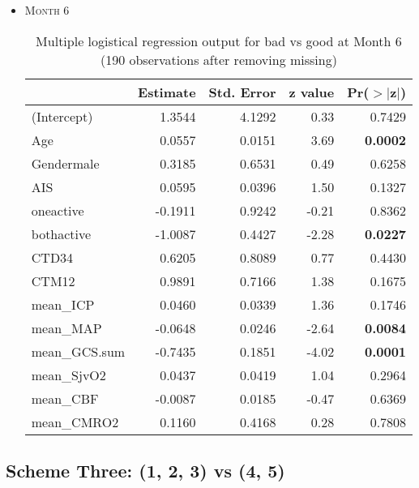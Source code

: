 \documentclass{article}
\begin{document}
\begin{itemize}
\item \textsc{Month 6}
\begin{table}[H]
\centering
\begin{tabular}{lrrrr}
  \hline
 & Estimate & Std. Error & z value & Pr($>$$|$z$|$) \\ 
  \hline
(Intercept) & 1.3544 & 4.1292 & 0.33 & 0.7429 \\ 
  Age & 0.0557 & 0.0151 & 3.69 & {\bf 0.0002} \\ 
  Gendermale & 0.3185 & 0.6531 & 0.49 & 0.6258 \\ 
  AIS & 0.0595 & 0.0396 & 1.50 & 0.1327 \\ 
  oneactive & -0.1911 & 0.9242 & -0.21 & 0.8362 \\ 
  bothactive & -1.0087 & 0.4427 & -2.28 & {\bf 0.0227} \\ 
  CTD34 & 0.6205 & 0.8089 & 0.77 & 0.4430 \\ 
  CTM12 & 0.9891 & 0.7166 & 1.38 & 0.1675 \\ 
  mean\_ICP & 0.0460 & 0.0339 & 1.36 & 0.1746 \\ 
  mean\_MAP & -0.0648 & 0.0246 & -2.64 & {\bf 0.0084} \\ 
  mean\_GCS.sum & -0.7435 & 0.1851 & -4.02 & {\bf 0.0001} \\ 
  mean\_SjvO2 & 0.0437 & 0.0419 & 1.04 & 0.2964 \\ 
  mean\_CBF & -0.0087 & 0.0185 & -0.47 & 0.6369 \\ 
  mean\_CMRO2 & 0.1160 & 0.4168 & 0.28 & 0.7808 \\ 
   \hline
\end{tabular}
\caption{Multiple logistical regression output for bad vs good at Month 6 (190 observations after removing missing)}
\end{table}

\end{itemize}



\newpage
\subsection{Scheme Three: (1, 2, 3) vs (4, 5)}
\end{document}
